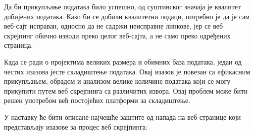 \documentclass[12pt,oneside]{memoir}
\begin{document}
Да би прикупљање података било успешно, од суштинског значаја је квалитет добијених података.  Како би се добили квалитетни подаци, потребно је да је сам веб-сајт исправан, односно да не садржи неисправне линкове, јер се веб скрејпинг обично изводи преко целог веб-сајта, а не само преко одређених страница.

Када се ради о пројектима великих размера и обимних база података, један од честих изазова јесте складиштење података. Овај изазов је повезан са ефикасним прикупљањем, обрадом и анализом велике количине података који се могу прикупити путем веб скрејпинга са различитих извора. Овај проблем може бити решен употребом већ постојећих платформи за складиштење.

У наставку ће бити описане најчешће заштите од напада на веб-странице који представљају изазове за процес веб скрејпинга:
\end{document}
